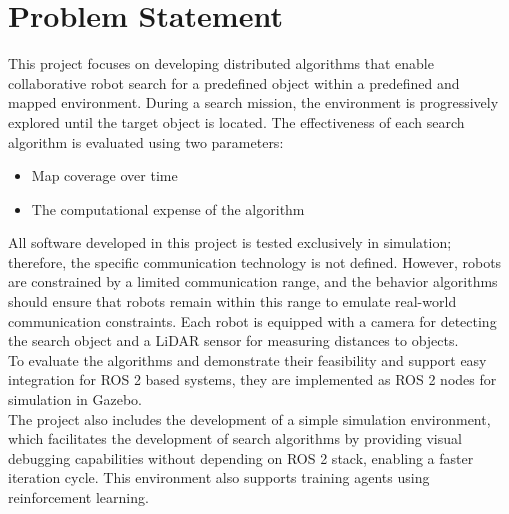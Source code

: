 \section{Problem Statement}
\label{sec:problem-statement}

This project focuses on developing distributed algorithms that enable collaborative robot search for a predefined object within a predefined and mapped environment. During a search mission, the environment is progressively explored until the target object is located. The effectiveness of each search algorithm is evaluated using two parameters:

\begin{itemize}
    \item Map coverage over time
    \item The computational expense of the algorithm
\end{itemize}

All software developed in this project is tested exclusively in simulation; therefore, the specific communication technology is not defined. However, robots are constrained by a limited communication range, and the behavior algorithms should ensure that robots remain within this range to emulate real-world communication constraints. Each robot is equipped with a camera for detecting the search object and a LiDAR sensor for measuring distances to objects. \\

To evaluate the algorithms and demonstrate their feasibility and support easy integration for ROS 2 based systems, they are implemented as ROS 2 nodes for simulation in Gazebo. \\

The project also includes the development of a simple simulation environment, which facilitates the development of search algorithms by providing visual debugging capabilities without depending on ROS 2 stack, enabling a faster iteration cycle. This environment also supports training agents using reinforcement learning.

